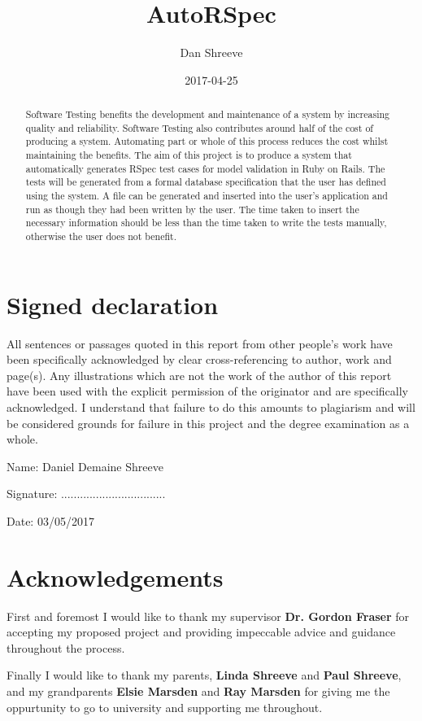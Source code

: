 \documentclass[a4paper,12pt]{article}
\title{AutoRSpec}
\date{2017-04-25}
\author{Dan Shreeve}
\begin{document}
\maketitle

\newpage
{}
\section*{Signed declaration}
All sentences or passages quoted in this report from other people's work have been specifically acknowledged by clear cross-referencing to author, work and page(s). Any illustrations which are not the work of the author of this report have been used with the explicit permission of the originator and are specifically acknowledged. I understand that failure to do this amounts to plagiarism and will be considered grounds for failure in this project and the degree examination as a whole.
\par Name: Daniel Demaine Shreeve
\par Signature: .................................
\par Date: 03/05/2017

\newpage
{}
\begin{abstract}
Software Testing benefits the development and maintenance of a system by increasing quality and reliability. Software Testing also contributes around half of the cost of producing a system. Automating part or whole of this process reduces the cost whilst maintaining the benefits. The aim of this project is to produce a system that automatically generates RSpec test cases for model validation in Ruby on Rails. The tests will be generated from a formal database specification that the user has defined using the system. A file can be generated and inserted into the user's application and run as though they had been written by the user. The time taken to insert the necessary information should be less than the time taken to write the tests manually, otherwise the user does not benefit.
\end{abstract}

\newpage
{}
\section*{Acknowledgements}
First and foremost I would like to thank my supervisor \textbf{Dr. Gordon Fraser} for accepting my proposed project and providing impeccable advice and guidance throughout the process.
\par Finally I would like to thank my parents, \textbf{Linda Shreeve} and \textbf{Paul Shreeve}, and my grandparents \textbf{Elsie Marsden} and \textbf{Ray Marsden} for giving me the oppurtunity to go to university and supporting me throughout.
\end{document}
